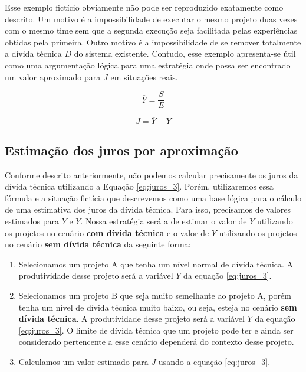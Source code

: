 Esse exemplo fictício obviamente não pode ser reproduzido exatamente como descrito. Um motivo é a impossibilidade de executar o mesmo projeto duas vezes com o mesmo time sem que a segunda execução seja facilitada pelas experiências obtidas pela primeira. Outro motivo é a impossibilidade de se remover totalmente a dívida técnica $D$ do sistema existente. Contudo, esse exemplo apresenta-se útil como uma argumentação lógica para uma estratégia onde possa ser encontrado um valor aproximado para $J$ em situações reais.

\begin{equation}
\label{eq:juros_2}
\overline{Y} =  \frac{S}{E}
\end{equation}


\begin{equation}
\label{eq:juros_3}
J = \overline{Y} - Y
\end{equation}

\subsection{Estimação dos juros por aproximação}
\label{estimacao_juros_por_aproximacao}

Conforme descrito anteriormente, não podemos calcular precisamente os juros da dívida técnica utilizando a Equação \ref{eq:juros_3}. Porém, utilizaremos essa fórmula e a situação fictícia que descrevemos como uma base lógica para o cálculo de uma estimativa dos juros da dívida técnica. Para isso, precisamos de valores estimados para $Y$ e $\overline{Y}$. Nossa estratégia será a de estimar o valor de $Y$ utilizando os projetos no cenário  \textbf{com dívida técnica} e o valor de $\overline{Y}$ utilizando os projetos no cenário  \textbf{sem dívida técnica} da seguinte forma:

\begin{enumerate}
\item Selecionamos um projeto A que tenha um nível normal de dívida técnica.  A produtividade desse projeto será a variável $Y$ da equação  \ref{eq:juros_3}.
\item Selecionamos um projeto B  que seja muito semelhante ao projeto A, porém tenha um nível de dívida técnica muito baixo, ou seja, esteja no cenário  \textbf{sem dívida técnica}. A produtividade desse projeto será a variável $
\overline{Y}$ da equação  \ref{eq:juros_3}. O limite de dívida técnica  que um projeto pode ter e ainda ser considerado pertencente a esse cenário dependerá do contexto desse projeto. 
\item Calculamos um valor estimado para $J$ usando a equação \ref{eq:juros_3}.
\end{enumerate}

